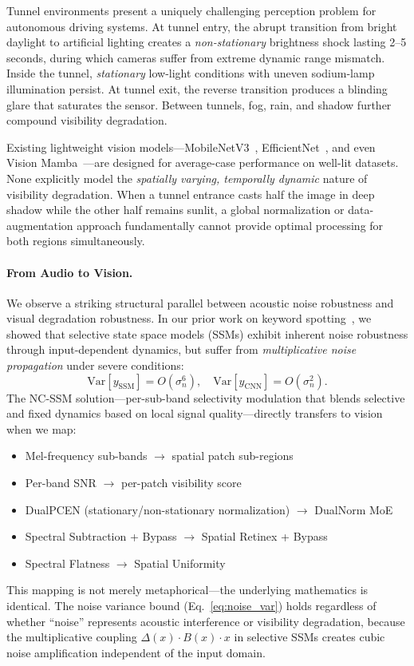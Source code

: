\documentclass[10pt,twocolumn,letterpaper]{article}
\begin{document}
Tunnel environments present a uniquely challenging perception problem for autonomous driving systems.
At tunnel entry, the abrupt transition from bright daylight to artificial lighting creates a \emph{non-stationary} brightness shock lasting 2--5 seconds, during which cameras suffer from extreme dynamic range mismatch.
Inside the tunnel, \emph{stationary} low-light conditions with uneven sodium-lamp illumination persist.
At tunnel exit, the reverse transition produces a blinding glare that saturates the sensor.
Between tunnels, fog, rain, and shadow further compound visibility degradation.

Existing lightweight vision models---MobileNetV3~\cite{howard2019searching}, EfficientNet~\cite{tan2019efficientnet}, and even Vision Mamba~\cite{zhu2024visionmamba}---are designed for average-case performance on well-lit datasets.
None explicitly model the \emph{spatially varying, temporally dynamic} nature of visibility degradation.
When a tunnel entrance casts half the image in deep shadow while the other half remains sunlit, a global normalization or data-augmentation approach fundamentally cannot provide optimal processing for both regions simultaneously.

\paragraph{From Audio to Vision.}
We observe a striking structural parallel between acoustic noise robustness and visual degradation robustness.
In our prior work on keyword spotting~\cite{choi2026ncssm}, we showed that selective state space models (SSMs) exhibit inherent noise robustness through input-dependent dynamics, but suffer from \emph{multiplicative noise propagation} under severe conditions:
\begin{equation}
\text{Var}[y_{\text{SSM}}] = O(\sigma_n^6), \quad
\text{Var}[y_{\text{CNN}}] = O(\sigma_n^2).
\label{eq:noise_var}
\end{equation}
The NC-SSM solution---per-sub-band selectivity modulation that blends selective and fixed dynamics based on local signal quality---directly transfers to vision when we map:
\begin{itemize}
\setlength\itemsep{0pt}
\item Mel-frequency sub-bands $\to$ spatial patch sub-regions
\item Per-band SNR $\to$ per-patch visibility score
\item DualPCEN (stationary/non-stationary normalization) $\to$ DualNorm MoE
\item Spectral Subtraction + Bypass $\to$ Spatial Retinex + Bypass
\item Spectral Flatness $\to$ Spatial Uniformity
\end{itemize}
This mapping is not merely metaphorical---the underlying mathematics is identical.
The noise variance bound (Eq.~\ref{eq:noise_var}) holds regardless of whether ``noise'' represents acoustic interference or visibility degradation, because the multiplicative coupling $\Delta(x) \cdot B(x) \cdot x$ in selective SSMs creates cubic noise amplification independent of the input domain.
\end{document}
